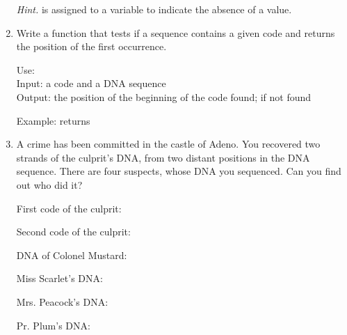\documentclass[11pt,class=report,crop=false]{standalone}
\begin{document}
\begin{activite}[DNA]
\begin{enumerate}
  \emph{Hint.}  is assigned to a variable to indicate the absence of a value. 
  
\medskip
   
  \item Write a function  that tests if a sequence contains a given code and returns the position of the first occurrence.
  
   \medskip
   
  \begin{fonction}[\ci{position()}]
  Use:  \\
  Input: a code and a DNA sequence \\
  Output: the position of the beginning of the code found;  if not found
  
  \medskip
    
  Example:  returns 
  \end{fonction}
  
    \medskip
  
  \item A crime has been committed in the castle of Adeno. 
You recovered two strands of the culprit's DNA, from two distant positions in the DNA sequence. There are four suspects, whose DNA you sequenced.
Can you find out who did it?

First code of the culprit:  

Second code of the culprit: 

\medskip

{\footnotesize
DNA of Colonel Mustard:


Miss Scarlet's DNA:



Mrs. Peacock's DNA:


Pr. Plum's DNA:


}
\end{enumerate}
\end{activite}


\end{document}
